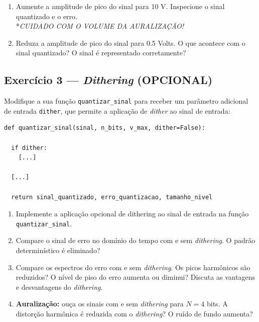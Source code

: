 \documentclass[a4paper,twoside,12pt]{article}
\begin{document}
	\begin{enumerate}
		\item Aumente a amplitude de pico do sinal para 10 V. Inspecione o sinal quantizado e o erro.\\
		*\emph{CUIDADO COM O VOLUME DA AURALIZAÇÃO!}
		
		\item Reduza a amplitude de pico do sinal para 0.5 Volts. O que acontece com o sinal quantizado? O sinal é representado corretamente?
	\end{enumerate}
	
	
	\subsection{Exercício 3 — \textit{Dithering} (OPCIONAL)}
	\label{sec:ex3}
	
	Modifique a sua função {\tt quantizar\_sinal} para receber um parâmetro adicional de entrada {\tt dither}, que permite a aplicação de \emph{dither} ao sinal de entrada:
	
\begin{lstlisting}[frame=single]
def quantizar_sinal(sinal, n_bits, v_max, dither=False):

  if dither:
    [...]
	
  [...]
		
  return sinal_quantizado, erro_quantizacao, tamanho_nivel
\end{lstlisting} 
	
	
	\begin{enumerate}
		\item Implemente a aplicação opcional de dithering ao sinal de entrada na função {\tt quantizar\_sinal}.
		
		\item Compare o sinal de erro no domínio do tempo com e sem \textit{dithering}. O padrão determinístico é eliminado?
		
		\item Compare os espectros do erro com e sem \textit{dithering}. Os picos harmônicos são reduzidos? O nível de piso do erro aumenta ou diminui? Discuta as vantagens e desvantagens do \emph{dithering}.
		
		\item \textbf{Auralização:} ouça os sinais com e sem \textit{dithering} para $N = 4$ bits. A distorção harmônica é reduzida com o \textit{dithering}? O ruído de fundo aumenta?
	\end{enumerate}
	
\end{document}
